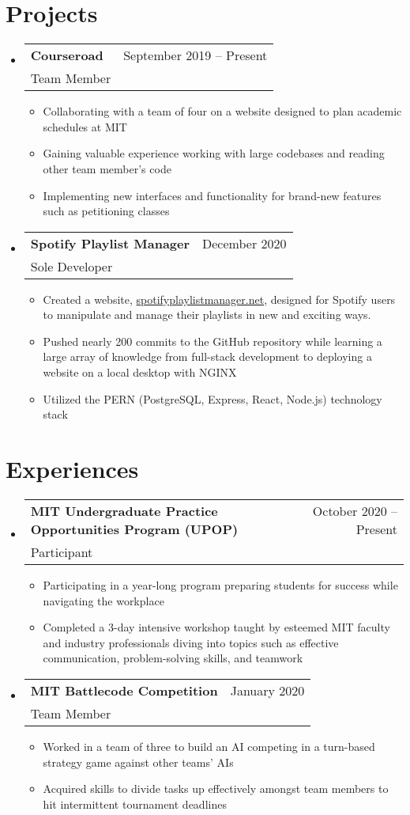 \documentclass[letterpaper,12pt]{article} %
\makeatletter
\newcommand{\CVItem}[1]{
  \item\small{
    {#1 \vspace{-2pt}}
  }
}
\newcommand{\CVSubheading}[4]{
  \vspace{-2pt}\item
    \begin{tabular*}{0.97\textwidth}[t]{l@{\extracolsep{\fill}}r}
      \textbf{#1} & #2 \\
      \small#3 & \small #4 \\
    \end{tabular*}\vspace{-7pt}
}
\newcommand{\CVSubHeadingListStart}{\begin{itemize}[leftmargin=0.15in, label={}]} %
\newcommand{\CVSubHeadingListEnd}{\end{itemize}}
\newcommand{\CVItemListStart}{\begin{itemize}}
\newcommand{\CVItemListEnd}{\end{itemize}\vspace{-5pt}}
\makeatother
\begin{document}
\section{Projects}
\CVSubHeadingListStart
\CVSubheading
{Courseroad}{September 2019 -- Present}
{Team Member}{}
\CVItemListStart
\CVItem{Collaborating with a team of four on a website designed to plan academic schedules at MIT}
\CVItem{Gaining valuable experience working with large codebases and reading other team member's code}
\CVItem{Implementing new interfaces and functionality for brand-new features such as petitioning classes}
\CVItemListEnd

\CVSubheading
{Spotify Playlist Manager}{December 2020}
{Sole Developer}{}
\CVItemListStart
\CVItem{Created a website, \href{www.spotifyplaylistmanaget.net}{spotifyplaylistmanager.net},
  designed for Spotify users to manipulate and manage their playlists in new and exciting ways.}
\CVItem{Pushed nearly 200 commits to the GitHub repository
  while learning a large array of knowledge from full-stack development to deploying a website on a local desktop with NGINX}
\CVItem{Utilized the PERN (PostgreSQL, Express, React, Node.js) technology stack}
\CVItemListEnd
\CVSubHeadingListEnd

\section{Experiences}
\CVSubHeadingListStart
\CVSubheading
{MIT Undergraduate Practice Opportunities Program (UPOP)}{October 2020 -- Present}
{Participant}{}
\CVItemListStart
\CVItem{Participating in a year-long program preparing students for success while navigating the workplace}
\CVItem{Completed a 3-day intensive workshop taught by esteemed MIT faculty and industry professionals
  diving into topics such as effective communication, problem-solving skills, and teamwork}
\CVItemListEnd

\CVSubheading
{MIT Battlecode Competition}{January 2020}
{Team Member}{}
\CVItemListStart
\CVItem{Worked in a team of three to build an AI competing in a turn-based strategy game against other teams' AIs}
\CVItem{Acquired skills to divide tasks up effectively amongst team members to hit intermittent tournament deadlines}
\CVItemListEnd

\CVSubHeadingListEnd
\end{document}
